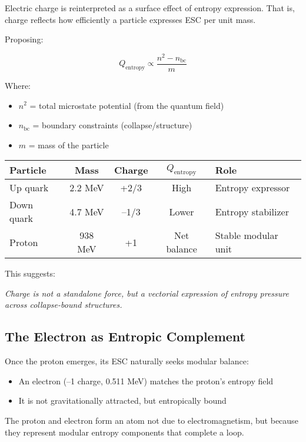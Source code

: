 \documentclass[12pt]{article}
\begin{document}
Electric charge is reinterpreted as a surface effect of entropy expression. That is, charge reflects how efficiently a particle expresses ESC per unit mass.

Proposing:

\[
Q_{\text{entropy}} \propto \frac{n^2 - n_{\text{bc}}}{m}
\]

Where:
\begin{itemize}
    \item $n^2$ = total microstate potential (from the quantum field)
    \item $n_{\text{bc}}$ = boundary constraints (collapse/structure)
    \item $m$ = mass of the particle
\end{itemize}

\vspace{0.5em}
\begin{center}
\begin{tabular}{|l|c|c|c|l|}
\hline
\textbf{Particle} & \textbf{Mass} & \textbf{Charge} & $Q_{\text{entropy}}$ & \textbf{Role} \\
\hline
Up quark & 2.2 MeV & +2/3 & High & Entropy expressor \\
\hline
Down quark & 4.7 MeV & –1/3 & Lower & Entropy stabilizer \\
\hline
Proton & 938 MeV & +1 & Net balance & Stable modular unit \\
\hline
\end{tabular}
\end{center}
\vspace{0.5em}

This suggests:

\textit{Charge is not a standalone force, but a vectorial expression of entropy pressure across collapse-bound structures.}

\subsection{The Electron as Entropic Complement}

Once the proton emerges, its ESC naturally seeks modular balance:
\begin{itemize}
    \item An electron (–1 charge, 0.511 MeV) matches the proton’s entropy field
    \item It is not gravitationally attracted, but entropically bound
\end{itemize}

The proton and electron form an atom not due to electromagnetism, but because they represent modular entropy components that complete a loop.
\end{document}
